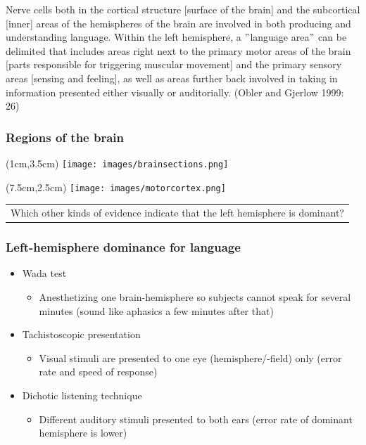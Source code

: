 \documentclass[12pt, table]{beamer}
\begin{document}
\begin{frame}
Nerve cells both in the cortical structure [surface of the brain] and the subcortical [inner] areas of the  hemispheres of the brain are involved in both producing and understanding language. Within the left hemisphere, a $"$language area$"$ can be delimited that includes areas right next to the primary motor areas of the brain [parts responsible for triggering muscular movement] and the primary sensory areas [sensing and feeling], as well as areas further back involved in taking in information presented either visually or auditorially. (Obler and Gjerlow 1999: 26)
\end{frame}

\begin{frame}
\frametitle{Regions of the brain}
\begin{textblock*}{8cm}(1cm,3.5cm)
\texttt{[image: images/brainsections.png]}
\end{textblock*}
\begin{textblock*}{8cm}(7.5cm,2.5cm)
\texttt{[image: images/motorcortex.png]}
\end{textblock*}
\end{frame}

\begin{frame}
\begin{tabularx}{\textwidth}{Y}
Which other kinds of evidence indicate that the left hemisphere is dominant?
\end{tabularx}
\end{frame}

\begin{frame}
\frametitle{Left-hemisphere dominance for language}
\begin{itemize}
\item Wada test
\begin{itemize}
\item Anesthetizing one brain-hemisphere so subjects cannot speak for several minutes (sound like aphasics a few minutes after that)
\end{itemize}
\item Tachistoscopic presentation
\begin{itemize}
\item Visual stimuli are presented to one eye (hemisphere/-field) only (error rate and speed of response)
\end{itemize}
\item Dichotic listening technique
\begin{itemize}
\item Different auditory stimuli presented to both ears (error rate of dominant hemisphere is lower)
\end{itemize}
\end{itemize}
\end{frame}
\end{document}

